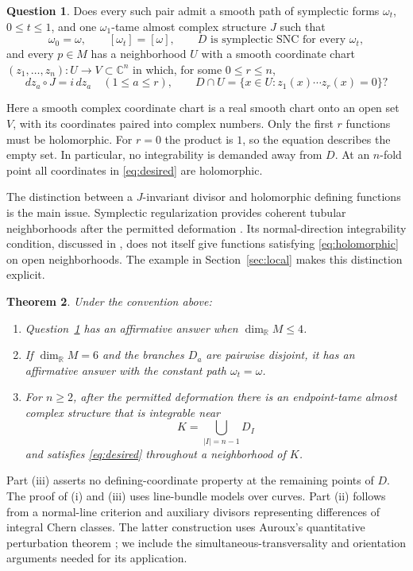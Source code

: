 \documentclass[11pt]{article}
\newtheorem{theorem}{Theorem}[section]
\theoremstyle{definition}
\newtheorem{question}[theorem]{Question}
\theoremstyle{remark}
\newcommand{\C}{\mathbb C}
\newcommand{\R}{\mathbb R}
\begin{document}
\begin{question}\label{q:main}
Does every such pair admit a smooth path of symplectic forms $\omega_t$, $0\leq t\leq1$, and one $\omega_1$-tame almost complex structure $J$ such that
\[
 \omega_0=\omega,\qquad [\omega_t]=[\omega],
 \qquad D\text{ is symplectic SNC for every }\omega_t,
\]
and every $p\in M$ has a neighborhood $U$ with a smooth coordinate chart $(z_1,\ldots,z_n):U\to V\subset\C^n$ in which, for some $0\leq r\leq n$,
\begin{equation}\label{eq:desired}
 dz_a\circ J=i\,dz_a\quad(1\leq a\leq r),
 \qquad D\cap U=\{x\in U:z_1(x)\cdots z_r(x)=0\}?
\end{equation}
\end{question}
Here a smooth complex coordinate chart is a real smooth chart onto an open set $V$, with its coordinates paired into complex numbers. Only the first $r$ functions must be holomorphic. For $r=0$ the product is $1$, so the equation describes the empty set. In particular, no integrability is demanded away from $D$. At an $n$-fold point all coordinates in \eqref{eq:desired} are holomorphic.

The distinction between a $J$-invariant divisor and holomorphic defining functions is the main issue. Symplectic regularization provides coherent tubular neighborhoods after the permitted deformation \cite[Theorem 2.13]{TMZ}. Its normal-direction integrability condition, discussed in \cite[Section 1.1]{TMZ}, does not itself give functions satisfying \eqref{eq:holomorphic} on open neighborhoods. The example in Section~\ref{sec:local} makes this distinction explicit.

\begin{theorem}\label{thm:partial}
Under the convention above:
\begin{enumerate}[label=(\roman*),leftmargin=*]
\item Question~\ref{q:main} has an affirmative answer when $\dim_\R M\leq4$.
\item If $\dim_\R M=6$ and the branches $D_a$ are pairwise disjoint, it has an affirmative answer with the constant path $\omega_t=\omega$.
\item For $n\geq2$, after the permitted deformation there is an endpoint-tame almost complex structure that is integrable near
\[
 K=\bigcup_{|I|=n-1}D_I
\]
and satisfies \eqref{eq:desired} throughout a neighborhood of $K$.
\end{enumerate}
\end{theorem}
Part (iii) asserts no defining-coordinate property at the remaining points of $D$. The proof of (i) and (iii) uses line-bundle models over curves. Part (ii) follows from a normal-line criterion and auxiliary divisors representing differences of integral Chern classes. The latter construction uses Auroux's quantitative perturbation theorem \cite[Theorem 2]{Auroux}; we include the simultaneous-transversality and orientation arguments needed for its application.
\end{document}
